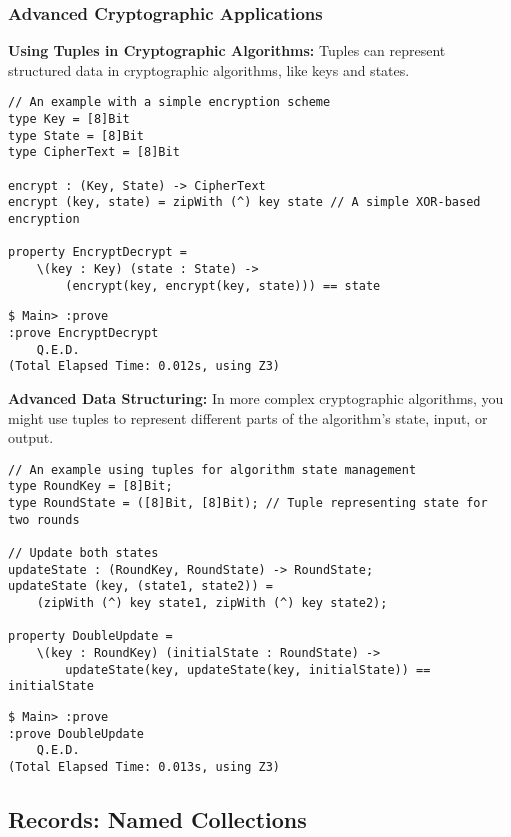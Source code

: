 \subsubsection{Advanced Cryptographic Applications}
\textbf{Using Tuples in Cryptographic Algorithms:} Tuples can represent structured data in cryptographic algorithms, like keys and states.
\begin{lstlisting}[style=cryptol]
// An example with a simple encryption scheme
type Key = [8]Bit
type State = [8]Bit
type CipherText = [8]Bit

encrypt : (Key, State) -> CipherText
encrypt (key, state) = zipWith (^) key state // A simple XOR-based encryption

property EncryptDecrypt = 
	\(key : Key) (state : State) ->
		(encrypt(key, encrypt(key, state))) == state
\end{lstlisting}
\begin{lstlisting}[style=zsh]
$ Main> :prove 
:prove EncryptDecrypt
	Q.E.D.
(Total Elapsed Time: 0.012s, using Z3)
\end{lstlisting}
\vspace{16pt}
\textbf{Advanced Data Structuring:} In more complex cryptographic algorithms, you might use tuples to represent different parts of the algorithm's state, input, or output.
\begin{lstlisting}[style=cryptol]
// An example using tuples for algorithm state management
type RoundKey = [8]Bit;
type RoundState = ([8]Bit, [8]Bit); // Tuple representing state for two rounds

// Update both states
updateState : (RoundKey, RoundState) -> RoundState;
updateState (key, (state1, state2)) =
	(zipWith (^) key state1, zipWith (^) key state2);

property DoubleUpdate = 
	\(key : RoundKey) (initialState : RoundState) ->
		updateState(key, updateState(key, initialState)) == initialState
\end{lstlisting}
\begin{lstlisting}[style=zsh]
$ Main> :prove 
:prove DoubleUpdate
	Q.E.D.
(Total Elapsed Time: 0.013s, using Z3)
\end{lstlisting}

\subsection{Records: Named Collections}
